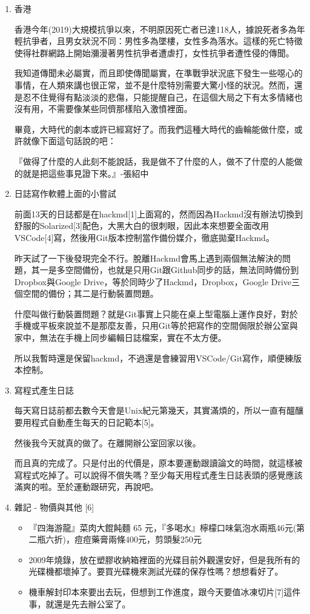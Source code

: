 \documentclass[a5paper, 12pt
]{book}
\providecommand{\tightlist}{%
  \setlength{\itemsep}{0pt}\setlength{\parskip}{0pt}}
\begin{document}
\begin{enumerate}
\def\labelenumi{\arabic{enumi}.}
\item
  香港

  香港今年(2019)大規模抗爭以來，不明原因死亡者已達118人，據說死者多為年輕抗爭者，且男女狀況不同：男性多為墜樓，女性多為落水。這樣的死亡特徵使得社群網路上開始瀰漫著男性抗爭者遭虐打，女性抗爭者遭性侵的傳聞。

  我知道傳聞未必屬實，而且即使傳聞屬實，在準戰爭狀況底下發生一些噁心的事情，在人類來講也很正常，並不是什麼特別需要大驚小怪的狀況。然而，還是忍不住覺得有點淡淡的悲傷，只能提醒自己，在這個大局之下有太多情緒也沒有用，不需要像某些同儕那樣陷入激憤裡面。

  畢竟，大時代的劇本或許已經寫好了。而我們這種大時代的齒輪能做什麼，或許就像下面這句話說的吧：

  『做得了什麼的人此刻不能說話，我是做不了什麼的人，做不了什麼的人能做的就是把這些事見證下來。』-張紹中
\item
  日誌寫作軟體上面的小嘗試

  前面13天的日誌都是在hackmd{[}1{]}上面寫的，然而因為Hackmd沒有辦法切換到舒服的Solarized{[}3{]}配色，大黑大白的很刺眼，因此本來想要全面改用VSCode{[}4{]}寫，然後用Git版本控制當作備份媒介，徹底拋棄Hackmd。

  昨天試了一下後發現完全不行。脫離Hackmd會馬上遇到兩個無法解決的問題，其一是多空間備份，也就是只用Git跟Github同步的話，無法同時備份到Dropbox與Google
  Drive，等於同時少了Hackmd，Dropbox，Google
  Drive三個空間的備份；其二是行動裝置問題。

  什麼叫做行動裝置問題？就是Git事實上只能在桌上型電腦上運作良好，對於手機或平板來說並不是那麼友善，只用Git等於把寫作的空間侷限於辦公室與家中，無法在手機上同步編輯日誌檔案，實在不太方便。

  所以我暫時還是保留hackmd，不過還是會練習用VSCode/Git寫作，順便練版本控制。
\item
  寫程式產生日誌

  每天寫日誌前都去數今天會是Unix紀元第幾天，其實滿煩的，所以一直有醞釀要用程式自動產生每天的日記範本{[}5{]}。

  然後我今天就真的做了。在離開辦公室回家以後。

  而且真的完成了。只是付出的代價是，原本要運動跟讀論文的時間，就這樣被寫程式吃掉了。可以說得不償失嗎？至少每天用程式產生日誌表頭的感覺應該滿爽的啦。至於運動跟研究，再說吧。
\item
  雜記 - 物價與其他 {[}6{]}

  \begin{itemize}
  \tightlist
  \item
    『四海游龍』菜肉大餛飩麵 65
    元，『多喝水』檸檬口味氣泡水兩瓶46元(第二瓶六折)，痘痘藥膏兩條400元，剪頭髮250元
  \item
    2009年燒錄，放在塑膠收納箱裡面的光碟目前外觀還安好，但是我所有的光碟機都壞掉了。要買光碟機來測試光碟的保存性嗎？想想看好了。
  \item
    機車解封印本來要出去玩，但想到工作進度，跟今天要值冰凍切片{[}7{]}這件事，就還是先去辦公室了。
  \end{itemize}
\end{enumerate}
\end{document}
